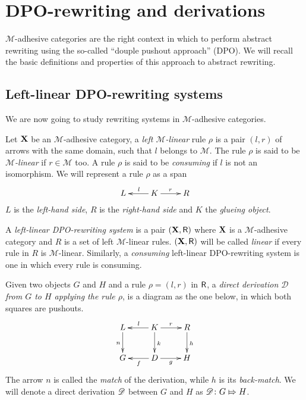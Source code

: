 \chapter{DPO-rewriting and derivations}

$\mathcal{M}$-adhesive categories are the right context in which to perform abstract rewriting using the so-called ``douple pushout approach'' (DPO). We will recall the basic definitions and properties of this approach to abstract rewriting. 

\section{Left-linear DPO-rewriting systems}
We are now going to study rewriting systems in $\mathcal{M}$-adhesive categories.

\begin{definition}
	Let $\textbf {\textup{X}}$ be an $\mathcal{M}$-adhesive category, a  \emph{left $\mathcal{M}$-linear} rule $\rho$ is a pair $(l,r)$ of arrows with the same domain, such that $l$ belongs to $\mathcal{M}$.  The rule $\rho$ is said to be \emph{$\mathcal{M}$-linear} if $r\in \mathcal{M}$ too. A rule $\rho$ is said to be \emph{consuming} if $l$ is not an isomorphism. We will represent a rule $\rho$ as a span 
	\[\xymatrix{L & K\ar[l]_{l} \ar[r]^{r} & R}\]
$L$ is the \emph{left-hand side}, $R$ is the \emph{right-hand side} and $K$ the \emph{glueing object}. 


A \emph{left-linear DPO-rewriting system} is a pair $(\textbf {\textup{X}}, \mathsf{R})$ where $\textbf {\textup{X}}$ is a $\mathcal{M}$-adhesive category and $R$ is a set of left $\mathcal{M}$-linear rules. $(\textbf {\textup{X}}, \mathsf{R})$ will be called \emph{linear} if every rule in $R$ is $\mathcal{M}$-linear. Similarly, a \emph{consuming} left-linear DPO-rewriting system is one in which every rule is consuming.

Given  two objects $G$ and $H$ and a rule $\rho=(l,r)$ in $\mathsf{R}$, a \emph{direct derivation $\mathscr{D}$ from $G$ to $H$ applying the rule $\rho$}, is a diagram as the one below, in which both squares are pushouts. 
	\[\xymatrix{L \ar[d]_{n}& K \ar[d]^{k}\ar[l]_{l} \ar[r]^{r} & R \ar[d]^{h}\\G & \ar[l]^{f} D \ar[r]_{g}& H}\]
	The arrow $n$ is called the \emph{match} of the derivation, while $h$ is its \emph{back-match}.
	We will denote a direct derivation $\mathscr{D}$ between $G$ and $H$ as $\mathscr{D}\colon G\Mapsto H$. 
\end{definition}

\begin{example}
\end{example}

